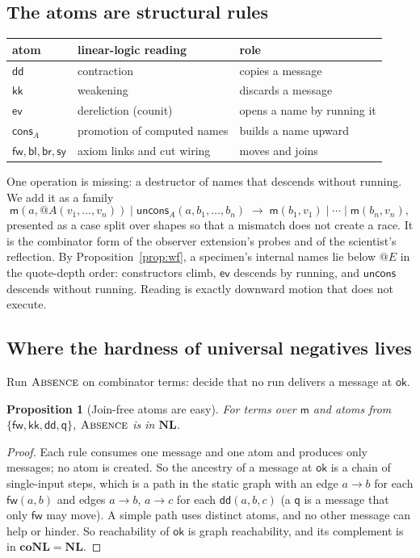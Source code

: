 \documentclass[11pt]{article}
\makeatletter
\theoremstyle{definition}
\theoremstyle{plain}
\newtheorem{proposition}[definition]{Proposition}
\theoremstyle{remark}
\newcommand{\quo}[1]{@#1}
\newcommand{\ok}{\mathsf{ok}}
\newcommand{\ABS}{\textup{\textsc{Absence}}}
\newcommand{\cm}{\mathsf{m}}
\newcommand{\cfw}{\mathsf{fw}}
\newcommand{\cdd}{\mathsf{dd}}
\newcommand{\ckk}{\mathsf{kk}}
\newcommand{\csy}{\mathsf{sy}}
\newcommand{\cbl}{\mathsf{bl}}
\newcommand{\cbr}{\mathsf{br}}
\newcommand{\cev}{\mathsf{ev}}
\newcommand{\cq}{\mathsf{q}}
\newcommand{\ccons}{\mathsf{cons}}
\newcommand{\cuncons}{\mathsf{uncons}}
\makeatother
\begin{document}
\subsection{The atoms are structural rules}

\begin{center}
\begin{tabular}{@{}lll@{}}
\toprule
atom & linear-logic reading & role \\
\midrule
$\cdd$ & contraction & copies a message \\
$\ckk$ & weakening & discards a message \\
$\cev$ & dereliction (counit) & opens a name by running it \\
$\ccons_A$ & promotion of computed names & builds a name upward \\
$\cfw, \cbl, \cbr, \csy$ & axiom links and cut wiring & moves and joins \\
\bottomrule
\end{tabular}
\end{center}

\noindent
One operation is missing: a destructor of names that descends without
running. We add it as a family
\[
\cm(a, \quo{A(v_1,\dots,v_n)}) \mid \cuncons_A(a, b_1, \dots, b_n) \;\to\;
\cm(b_1,v_1) \mid \cdots \mid \cm(b_n,v_n),
\]
presented as a case split over shapes so that a mismatch does not create a
race. It is the combinator form of the observer extension's probes
\cite{ObserverExt} and of the scientist's reflection. By
Proposition~\ref{prop:wf}, a specimen's internal names lie below
$\quo{E}$ in the quote-depth order: constructors climb, $\cev$ descends by
running, and $\cuncons$ descends without running. Reading is exactly
downward motion that does not execute.

\subsection{Where the hardness of universal negatives lives}\label{sec:joins}

Run $\ABS$ on combinator terms: decide that no run delivers a message at
$\ok$.

\begin{proposition}[Join-free atoms are easy]\label{prop:nl}
For terms over $\cm$ and atoms from $\{\cfw, \ckk, \cdd, \cq\}$, $\ABS$ is
in $\mathbf{NL}$.
\end{proposition}

\begin{proof}
Each rule consumes one message and one atom and produces only messages;
no atom is created. So the ancestry of a message at $\ok$ is a chain of
single-input steps, which is a path in the static graph with an edge
$a \to b$ for each $\cfw(a,b)$ and edges $a \to b$, $a \to c$ for each
$\cdd(a,b,c)$ (a $\cq$ is a message that only $\cfw$ may move). A simple
path uses distinct atoms, and no other message can help or hinder. So
reachability of $\ok$ is graph reachability, and its complement is in
$\mathbf{coNL} = \mathbf{NL}$.
\end{proof}
\end{document}
